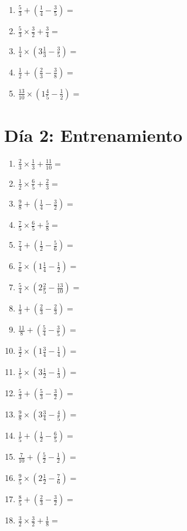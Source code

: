 \documentclass[12pt]{article}
\begin{document}
\begin{enumerate}[itemsep=1.5cm]
	\item $\displaystyle \frac{5}{3} + \left( \frac{1}{4} - \frac{3}{5} \right) =$
	\item $\displaystyle \frac{5}{3} \times \frac{3}{2} + \frac{3}{4} =$
	\item $\displaystyle \frac{1}{4} \times \left( 3 \frac{1}{3} - \frac{3}{5} \right) =$
	\item $\displaystyle \frac{1}{2} + \left( \frac{2}{3} - \frac{3}{8} \right) =$
	\item $\displaystyle \frac{13}{10} \times \left( 1 \frac{4}{5} - \frac{1}{2} \right) =$
\end{enumerate}
\section*{Día 2: Entrenamiento}
\begin{enumerate}[ itemsep=1.5cm]
	\item $\displaystyle \frac{2}{3} \times \frac{1}{3} + \frac{11}{10} =$
	\item $\displaystyle \frac{1}{2} \times \frac{6}{5} + \frac{2}{3} =$
	\item $\displaystyle \frac{9}{8} + \left( \frac{1}{4} - \frac{3}{2} \right) =$
	\item $\displaystyle \frac{7}{5} \times \frac{6}{5} + \frac{5}{8} =$
	\item $\displaystyle \frac{7}{4} + \left( \frac{1}{2} - \frac{5}{6} \right) =$
	\item $\displaystyle \frac{7}{6} \times \left( 1 \frac{1}{4} - \frac{1}{2} \right) =$
	\item $\displaystyle \frac{5}{4} \times \left( 2 \frac{2}{5} - \frac{13}{10} \right) =$
	\item $\displaystyle \frac{1}{3} + \left( \frac{2}{3} - \frac{2}{3} \right) =$
	\item $\displaystyle \frac{11}{8} + \left( \frac{5}{4} - \frac{3}{5} \right) =$

	\item $\displaystyle \frac{3}{2} \times \left( 1 \frac{3}{4} - \frac{1}{4} \right) =$
	\item $\displaystyle \frac{1}{5} \times \left( 3 \frac{1}{2} - \frac{1}{3} \right) =$
	\item $\displaystyle \frac{5}{3} + \left( \frac{5}{3} - \frac{3}{2} \right) =$
	\item $\displaystyle \frac{9}{8} \times \left( 3 \frac{3}{4} - \frac{4}{5} \right) =$
	\item $\displaystyle \frac{1}{5} + \left( \frac{1}{2} - \frac{6}{5} \right) =$
	\item $\displaystyle \frac{7}{10} + \left( \frac{5}{2} - \frac{1}{2} \right) =$
	\item $\displaystyle \frac{9}{5} \times \left( 2 \frac{1}{2} - \frac{7}{6} \right) =$
	\item $\displaystyle \frac{8}{5} + \left( \frac{2}{3} - \frac{3}{2} \right) =$
	\item $\displaystyle \frac{3}{2} \times \frac{3}{2} + \frac{1}{8} =$


\end{enumerate}
\end{document}
